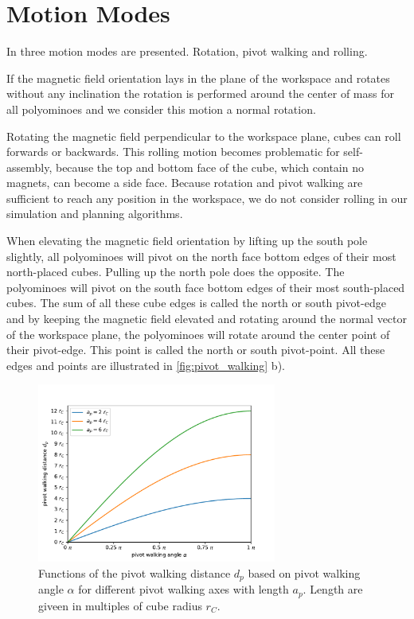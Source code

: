 \section{Motion Modes}
\label{sec:motion}
In \cite{Bhattacharjee2022} three motion modes are presented. Rotation, pivot walking and rolling.

If the magnetic field orientation lays in the plane of the workspace and rotates without any inclination the rotation is performed around the center of mass for all polyominoes and we consider this motion a normal rotation.

Rotating the magnetic field perpendicular to the workspace plane, cubes can roll forwards or backwards.
This rolling motion becomes problematic for self-assembly, because the top and bottom face of the cube, which contain no magnets, can become a side face.
Because rotation and pivot walking are sufficient to reach any position in the workspace, we do not consider rolling in our simulation and planning algorithms.

When elevating the magnetic field orientation by lifting up the south pole slightly, all polyominoes will pivot on the north face bottom edges of their most north-placed cubes.
Pulling up the north pole does the opposite. The polyominoes will pivot on the south face bottom edges of their most south-placed cubes.
The sum of all these cube edges is called the north or south pivot-edge and by keeping the magnetic field elevated and rotating around the normal vector of the workspace plane, the polyominoes will rotate around the center point of their pivot-edge.
This point is called the north or south pivot-point.
All these edges and points are illustrated in \autoref{fig:pivot_walking} b).

\begin{figure}
	\centering
	\includegraphics[width=0.70\textwidth]{figures/plots/pivot_walking_angle.pdf}
	\caption[Functions of $d_p$ based on $\alpha$ for different $a_p$]{Functions of the pivot walking distance $d_p$ based on pivot walking angle $\alpha$ for different pivot walking axes with length $a_p$. Length are giveen in multiples of cube radius $r_C$.}
	\label{fig:pw_angle_plot}
\end{figure}

